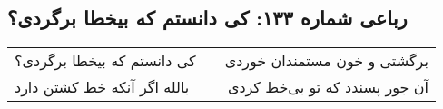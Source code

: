 \begin{center}
\section*{رباعی شماره ۱۳۳: کی دانستم که بیخطا برگردی؟}
\label{sec:133}
\begin{longtable}{l p{0.5cm} r}
کی دانستم که بیخطا برگردی؟
&&
برگشتی و خون مستمندان خوردی
\\
بالله اگر آنکه خط کشتن دارد
&&
آن جور پسندد که تو بی‌خط کردی
\\
\end{longtable}
\end{center}
